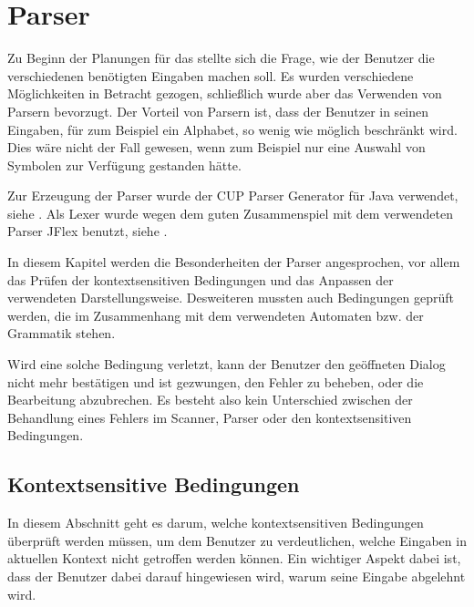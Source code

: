 

\chapter{Parser}\label{Parser}

Zu Beginn der Planungen für das \gtitool stellte sich die Frage, wie der
Benutzer die verschiedenen benötigten Eingaben machen soll. Es wurden
verschiedene Möglichkeiten in Betracht gezogen, schließlich wurde aber das
Verwenden von Parsern bevorzugt. Der Vorteil von Parsern ist, dass der Benutzer
in seinen Eingaben, für zum Beispiel ein Alphabet, so wenig wie möglich
beschränkt wird. Dies wäre nicht der Fall gewesen, wenn zum Beispiel nur eine
Auswahl von Symbolen zur Verfügung gestanden hätte.\vspace{10pt}

Zur Erzeugung der Parser wurde der CUP Parser Generator für Java verwendet, siehe
\cite{java-cup}. Als Lexer wurde wegen dem guten Zusammenspiel mit dem
verwendeten Parser JFlex benutzt, siehe \cite{jflex}.\vspace{10pt}

In diesem Kapitel werden die Besonderheiten der Parser angesprochen, vor allem
das Prüfen der kontextsensitiven Bedingungen und das Anpassen der verwendeten
Darstellungsweise. Desweiteren mussten auch Bedingungen geprüft werden, die im
Zusammenhang mit dem verwendeten Automaten bzw. der Grammatik
stehen.\vspace{10pt}

Wird eine solche Bedingung verletzt, kann der Benutzer den geöffneten Dialog
nicht mehr bestätigen und ist gezwungen, den Fehler zu beheben, oder die
Bearbeitung abzubrechen. Es besteht also kein Unterschied zwischen der
Behandlung eines Fehlers im Scanner, Parser oder den kontextsensitiven
Bedingungen.\vspace{10pt}


\section{Kontextsensitive Bedingungen}

In diesem Abschnitt geht es darum, welche kontextsensitiven Bedingungen
über\-prüft werden müssen, um dem Benutzer zu verdeutlichen, welche Eingaben
in aktuellen Kontext nicht getroffen werden können. Ein wichtiger Aspekt dabei
ist, dass der Benutzer dabei darauf hingewiesen wird, warum seine Eingabe
abgelehnt wird.\vspace{10pt}

